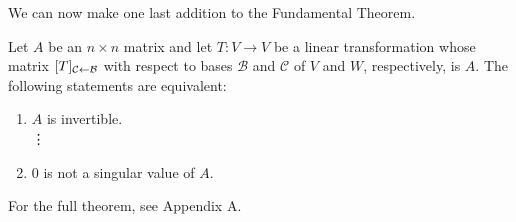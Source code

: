 \documentclass[../m073main.tex]{subfiles}
\begin{document}
We can now make one last addition to the Fundamental Theorem.

\begin{theorem}
	Let $A$ be an $n\times n$ matrix and let $T : V \to V$ be a linear transformation whose matrix $[T]_{\mathcal{C} \leftarrow \mathcal{B}}$ with respect to bases $\mathcal{B}$ and $\mathcal{C}$ of $V$ and $W$, respectively, is $A$.
	The following statements are equivalent:
	\begin{enumerate}[label=(\alph*)]
		\item $A$ is invertible. \\
		\phantom{~}\hspace{-19.5pt} \vdots
		\setcounter{enumi}{20}
		\item 0 is not a singular value of $A$.
	\end{enumerate}
	For the full theorem, see Appendix A.
\end{theorem}
\end{document}
